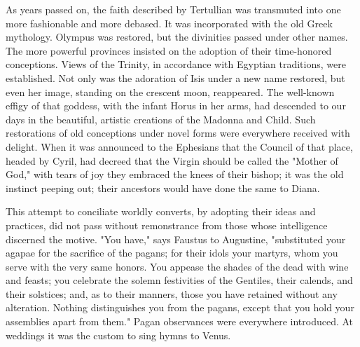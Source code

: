 As years passed on, the faith described by Tertullian was transmuted into one more
fashionable and more debased. It was incorporated with the old Greek mythology. Olympus
was restored, but the divinities passed under other names. The more powerful provinces
insisted on the adoption of their time-honored conceptions. Views of the Trinity, in
accordance with Egyptian traditions, were established. Not only was the adoration of Isis
under a new name restored, but even her image, standing on the crescent moon, reappeared.
The well-known effigy of that goddess, with the infant Horus in her arms, had descended to
our days in the beautiful, artistic creations of the Madonna and Child. Such restorations of
old conceptions under novel forms were everywhere received with delight. When it was
announced to the Ephesians that the Council of that place, headed by Cyril, had decreed that
the Virgin should be called the "Mother of God," with tears of joy they embraced the knees
of their bishop; it was the old instinct peeping out; their ancestors would have done the same
to Diana.

This attempt to conciliate worldly converts, by adopting their ideas and practices, did not
pass without remonstrance from those whose intelligence discerned the motive. "You have,"
says Faustus to Augustine, "substituted your agapae for the sacrifice of the pagans; for their
idols your martyrs, whom you serve with the very same honors. You appease the shades of
the dead with wine and feasts; you celebrate the solemn festivities of the Gentiles, their
calends, and their solstices; and, as to their manners, those you have retained without any
alteration. Nothing distinguishes you from the pagans, except that you hold your assemblies
apart from them." Pagan observances were everywhere introduced. At weddings it was the
custom to sing hymns to Venus.

